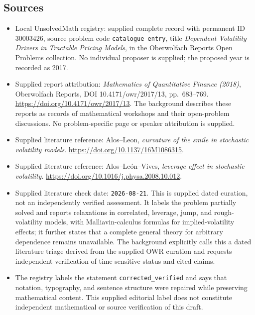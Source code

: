 \documentclass[11pt]{article}
\begin{document}
\subsection{Sources}
\begin{itemize}
\item Local UnsolvedMath registry: supplied complete record with permanent ID \(30003426\), source problem code \texttt{catalogue entry}, title \emph{Dependent Volatility Drivers in Tractable Pricing Models}, in the Oberwolfach Reports Open Problems collection. No individual proposer is supplied; the proposed year is recorded as 2017.
\item Supplied report attribution: \emph{Mathematics of Quantitative Finance (2018)}, Oberwolfach Reports, DOI 10.4171/owr/2017/13, pp.~683--769. \url{https://doi.org/10.4171/owr/2017/13}. The background describes these reports as records of mathematical workshops and their open-problem discussions. No problem-specific page or speaker attribution is supplied.
\item Supplied literature reference: Alos--Leon, \emph{curvature of the smile in stochastic volatility models}. \url{https://doi.org/10.1137/16M1086315}.
\item Supplied literature reference: Alos--Le\'on--Vives, \emph{leverage effect in stochastic volatility}. \url{https://doi.org/10.1016/j.physa.2008.10.012}.
\item Supplied literature check date: \texttt{2026-08-21}. This is supplied dated curation, not an independently verified assessment. It labels the problem partially solved and reports relaxations in correlated, leverage, jump, and rough-volatility models, with Malliavin-calculus formulas for implied-volatility effects; it further states that a complete general theory for arbitrary dependence remains unavailable. The background explicitly calls this a dated literature triage derived from the supplied OWR curation and requests independent verification of time-sensitive status and cited claims.
\item The registry labels the statement \texttt{corrected\_verified} and says that notation, typography, and sentence structure were repaired while preserving mathematical content. This supplied editorial label does not constitute independent mathematical or source verification of this draft.
\end{itemize}
\end{document}

